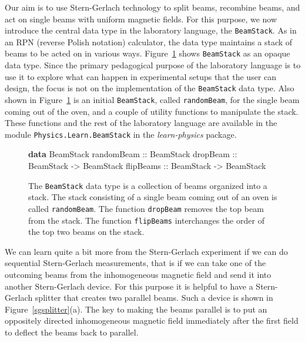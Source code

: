 \documentclass{eptcs}
\newcommand{\KeywordTok}[1]{\textcolor[rgb]{0.00,0.44,0.13}{\textbf{{#1}}}}
\newcommand{\DataTypeTok}[1]{\textcolor[rgb]{0.56,0.13,0.00}{{#1}}}
\newcommand{\SpecialCharTok}[1]{\textcolor[rgb]{0.25,0.44,0.63}{{#1}}}
\newcommand{\FunctionTok}[1]{\textcolor[rgb]{0.02,0.16,0.49}{{#1}}}
\begin{document}
Our aim is to use Stern-Gerlach technology to split beams, recombine beams,
and act on single beams with uniform magnetic fields.
For this purpose, we now introduce the central data type in the laboratory
language, the \DataTypeTok{\texttt{BeamStack}}.
As in an RPN (reverse Polish notation) calculator, the data type maintains
a stack of beams to be acted on in various ways.
Figure~\ref{expapicore} shows \DataTypeTok{\texttt{BeamStack}} as
an opaque data type.  Since the primary pedagogical purpose of the laboratory
language is to use it to explore what can happen in experimental setups
that the user can design, the focus is not on the implementation
of the \DataTypeTok{\texttt{BeamStack}} data type.
Also shown in Figure~\ref{expapicore} is an initial \DataTypeTok{\texttt{BeamStack}},
called \FunctionTok{\texttt{randomBeam}},
for the single beam coming out of the oven, and a couple of utility
functions to manipulate the stack.
These functions and the rest of the laboratory language
are available in the module \texttt{Physics.Learn.BeamStack} in the \emph{learn-physics}
package\cite{learn-physics}.

\begin{figure}
\begin{Highlighting}[]
\KeywordTok{data} \DataTypeTok{BeamStack}
\FunctionTok{randomBeam} \SpecialCharTok{::} \DataTypeTok{BeamStack}
\FunctionTok{dropBeam}   \SpecialCharTok{::} \DataTypeTok{BeamStack} \SpecialCharTok{->} \DataTypeTok{BeamStack}
\FunctionTok{flipBeams}  \SpecialCharTok{::} \DataTypeTok{BeamStack} \SpecialCharTok{->} \DataTypeTok{BeamStack}
\end{Highlighting}
\caption{The \DataTypeTok{\texttt{BeamStack}} data type is a collection of beams
  organized into a stack.  The stack consisting of a single beam coming out of an oven
  is called \FunctionTok{\texttt{randomBeam}}.
  The function \FunctionTok{\texttt{dropBeam}} removes the top beam from the stack.
  The function \FunctionTok{\texttt{flipBeams}} interchanges the order of the top two beams
  on the stack.
}
\label{expapicore}
\end{figure}

We can learn quite a bit more from the Stern-Gerlach experiment
if we can do sequential Stern-Gerlach measurements, that is if we can take
one of the outcoming beams from the inhomogeneous magnetic field
and send it into another Stern-Gerlach device.  For this purpose
it is helpful to have a Stern-Gerlach splitter that creates two
parallel beams.  Such a device is shown in Figure~\ref{sgsplitter}(a).
The key to making the beams parallel is to put an oppositely
directed inhomogeneous magnetic field immediately after the
first field to deflect the beams back to parallel.
\end{document}
